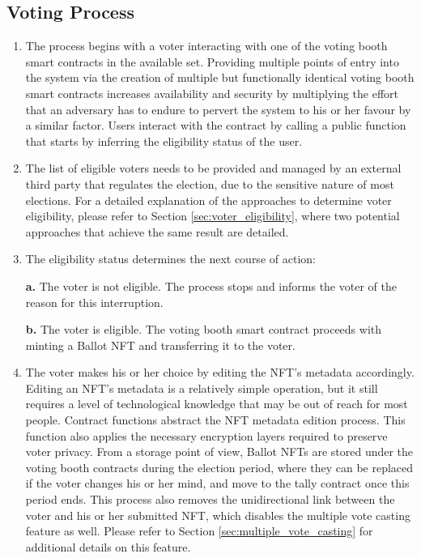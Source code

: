 \documentclass[../main.tex]{subfiles}
\begin{document}
\subsection{Voting Process}
\begin{enumerate}
    \item{The process begins with a voter interacting with one of the voting booth smart contracts in the available set. Providing multiple points of entry into the system via the creation of multiple but functionally identical voting booth smart contracts increases availability and security by multiplying the effort that an adversary has to endure to pervert the system to his or her favour by a similar factor. Users interact with the contract by calling a public function that starts by inferring the eligibility status of the user.}

    \item{The list of eligible voters needs to be provided and managed by an external third party that regulates the election, due to the sensitive nature of most elections. For a detailed explanation of the approaches to determine voter eligibility, please refer to Section \ref{sec:voter_eligibility}, where two potential approaches that achieve the same result are detailed.}

    \item{The eligibility status determines the next course of action:
          \par
          \textbf{a.} The voter is not eligible. The process stops and informs the voter of the reason for this interruption.
          \par
          \textbf{b.} The voter is eligible. The voting booth smart contract proceeds with minting a Ballot NFT and transferring it to the voter.}

    \item{The voter makes his or her choice by editing the NFT's metadata accordingly. Editing an NFT's metadata is a relatively simple operation, but it still requires a level of technological knowledge that may be out of reach for most people. Contract functions abstract the NFT metadata edition process. This function also applies the necessary encryption layers required to preserve voter privacy. From a storage point of view, Ballot NFTs are stored under the voting booth contracts during the election period, where they can be replaced if the voter changes his or her mind, and move to the tally contract once this period ends. This process also removes the unidirectional link between the voter and his or her submitted NFT, which disables the multiple vote casting feature as well. Please refer to Section \ref{sec:multiple_vote_casting} for additional details on this feature.}


\end{enumerate}
\end{document}
